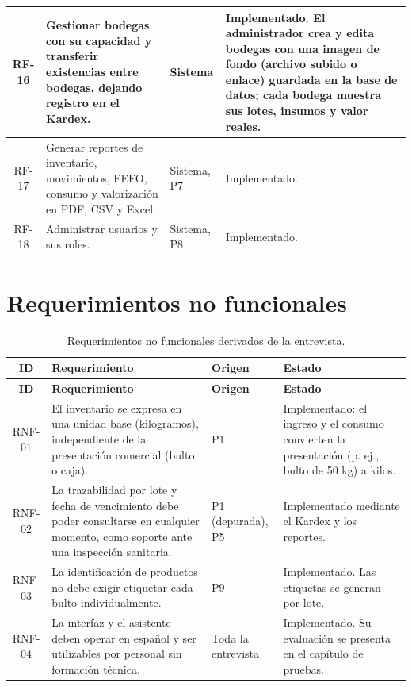 \begin{longtable}{|c|p{6.3cm}|p{1.9cm}|p{4.2cm}|}
RF-16 & Gestionar bodegas con su capacidad y transferir existencias entre bodegas, dejando registro en el Kardex. & Sistema & Implementado. El administrador crea y edita bodegas con una imagen de fondo (archivo subido o enlace) guardada en la base de datos; cada bodega muestra sus lotes, insumos y valor reales. \\ \hline
RF-17 & Generar reportes de inventario, movimientos, FEFO, consumo y valorización en PDF, CSV y Excel. & Sistema, P7 & Implementado. \\ \hline
RF-18 & Administrar usuarios y sus roles. & Sistema, P8 & Implementado. \\ \hline
\end{longtable}

\section{Requerimientos no funcionales}
\label{sec:req_rnf}

\begin{longtable}{|c|p{7.3cm}|p{1.6cm}|p{3.5cm}|}
\caption{Requerimientos no funcionales derivados de la entrevista.}
\label{tab:req_rnf}\\
\hline
\textbf{ID} & \textbf{Requerimiento} & \textbf{Origen} & \textbf{Estado} \\
\hline
\endfirsthead
\hline
\textbf{ID} & \textbf{Requerimiento} & \textbf{Origen} & \textbf{Estado} \\
\hline
\endhead
RNF-01 & El inventario se expresa en una unidad base (kilogramos), independiente de la presentación comercial (bulto o caja). & P1 & Implementado: el ingreso y el consumo convierten la presentación (p. ej., bulto de 50 kg) a kilos. \\ \hline
RNF-02 & La trazabilidad por lote y fecha de vencimiento debe poder consultarse en cualquier momento, como soporte ante una inspección sanitaria. & P1 (depurada), P5 & Implementado mediante el Kardex y los reportes. \\ \hline
RNF-03 & La identificación de productos no debe exigir etiquetar cada bulto individualmente. & P9 & Implementado. Las etiquetas se generan por lote. \\ \hline
RNF-04 & La interfaz y el asistente deben operar en español y ser utilizables por personal sin formación técnica. & Toda la entrevista & Implementado. Su evaluación se presenta en el capítulo de pruebas. \\ \hline
\end{longtable}

